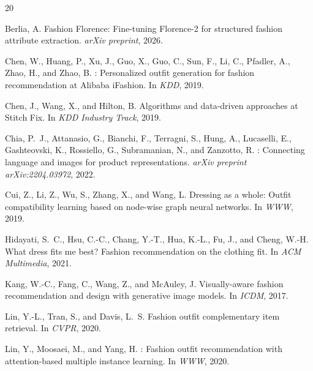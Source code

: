 \documentclass[10pt,twocolumn]{article}
\begin{document}

\begin{thebibliography}{20}

Berlia, A.
\newblock Fashion {Florence}: Fine-tuning {Florence-2} for structured fashion
attribute extraction.
\newblock \emph{arXiv preprint}, 2026.

Chen, W., Huang, P., Xu, J., Guo, X., Guo, C., Sun, F., Li, C., Pfadler,
A., Zhao, H., and Zhao, B.
: Personalized outfit generation for fashion recommendation at
{Alibaba iFashion}.
\newblock In \emph{KDD}, 2019.

Chen, J., Wang, X., and Hilton, B.
\newblock Algorithms and data-driven approaches at {Stitch Fix}.
\newblock In \emph{KDD Industry Track}, 2019.

Chia, P.~J., Attanasio, G., Bianchi, F., Terragni, S., Hung, A.,
Lucaselli, E., Gashteovski, K., Rossiello, G., Subramanian, N., and
Zanzotto, R.
: Connecting language and images for product
representations.
\newblock \emph{arXiv preprint arXiv:2204.03972}, 2022.

Cui, Z., Li, Z., Wu, S., Zhang, X., and Wang, L.
\newblock Dressing as a whole: Outfit compatibility learning based on node-wise
graph neural networks.
\newblock In \emph{WWW}, 2019.

Hidayati, S.~C., Hsu, C.-C., Chang, Y.-T., Hua, K.-L., Fu, J., and Cheng,
W.-H.
\newblock What dress fits me best? Fashion recommendation on the clothing
fit.
\newblock In \emph{ACM Multimedia}, 2021.

Kang, W.-C., Fang, C., Wang, Z., and McAuley, J.
\newblock Visually-aware fashion recommendation and design with generative
image models.
\newblock In \emph{ICDM}, 2017.

Lin, Y.-L., Tran, S., and Davis, L.~S.
\newblock Fashion outfit complementary item retrieval.
\newblock In \emph{CVPR}, 2020.

Lin, Y., Moosaei, M., and Yang, H.
: Fashion outfit recommendation with attention-based
multiple instance learning.
\newblock In \emph{WWW}, 2020.


\end{thebibliography}
\end{document}
